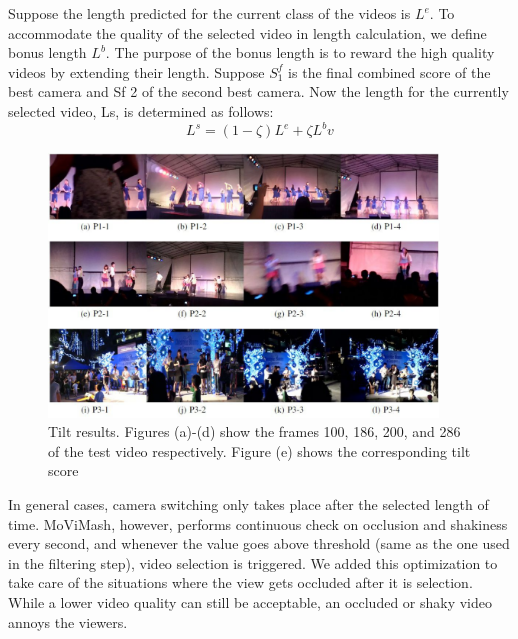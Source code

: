 \documentclass{sig-alternate}
\begin{document}
Suppose the length predicted for the current class of the videos is \(L^e\). To accommodate the quality of the selected video in length calculation, we deﬁne bonus length \(L^b\). The purpose of the bonus length is to reward the high quality videos by extending their length. Suppose \(S^f_1\) is the ﬁnal combined score of the best camera and Sf 2 of the second best camera. Now the length for the currently selected video, Ls, is determined as follows:
\begin{equation}
L^s = (1- \zeta)L^e + \zeta L^bv
\end{equation}

\begin{figure}[h]
\includegraphics[width=\textwidth ,height = 7cm]{video_4}
\caption{Tilt results. Figures (a)-(d) show the frames 100, 186, 200, and 286 of the test video respectively. Figure (e) shows the corresponding tilt score}
\label{fig:figure6}
\end{figure}

In general cases, camera switching only takes place after the selected length of time. MoViMash, however, performs continuous check on occlusion and shakiness every second, and whenever the value goes above threshold (same as the one used in the ﬁltering step), video selection is triggered. We added this optimization to take care of the situations where the view gets occluded after it is selection. While a lower video quality can still be acceptable, an occluded or shaky video annoys the viewers.
\end{document}
